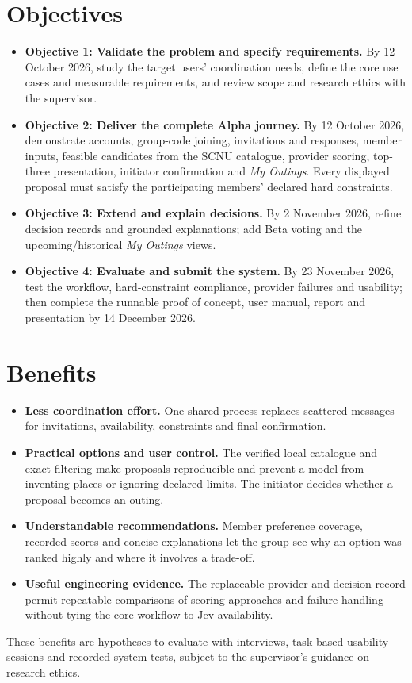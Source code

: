 \documentclass[12pt,a4paper]{article}
\newcommand{\objective}[1]{\textbf{Objective #1}}
\begin{document}
\section*{Objectives}
\begin{itemize}
  \item \objective{1: Validate the problem and specify requirements.} By 12 October 2026, study the target users' coordination needs, define the core use cases and measurable requirements, and review scope and research ethics with the supervisor.
  \item \objective{2: Deliver the complete Alpha journey.} By 12 October 2026, demonstrate accounts, group-code joining, invitations and responses, member inputs, feasible candidates from the SCNU catalogue, provider scoring, top-three presentation, initiator confirmation and \emph{My Outings}. Every displayed proposal must satisfy the participating members' declared hard constraints.
  \item \objective{3: Extend and explain decisions.} By 2 November 2026, refine decision records and grounded explanations; add Beta voting and the upcoming/historical \emph{My Outings} views.
  \item \objective{4: Evaluate and submit the system.} By 23 November 2026, test the workflow, hard-constraint compliance, provider failures and usability; then complete the runnable proof of concept, user manual, report and presentation by 14 December 2026.
\end{itemize}

\section*{Benefits}
\begin{itemize}
  \item \textbf{Less coordination effort.} One shared process replaces scattered messages for invitations, availability, constraints and final confirmation.
  \item \textbf{Practical options and user control.} The verified local catalogue and exact filtering make proposals reproducible and prevent a model from inventing places or ignoring declared limits. The initiator decides whether a proposal becomes an outing.
  \item \textbf{Understandable recommendations.} Member preference coverage, recorded scores and concise explanations let the group see why an option was ranked highly and where it involves a trade-off.
  \item \textbf{Useful engineering evidence.} The replaceable provider and decision record permit repeatable comparisons of scoring approaches and failure handling without tying the core workflow to Jev availability.
\end{itemize}
These benefits are hypotheses to evaluate with interviews, task-based usability sessions and recorded system tests, subject to the supervisor's guidance on research ethics.
\end{document}
